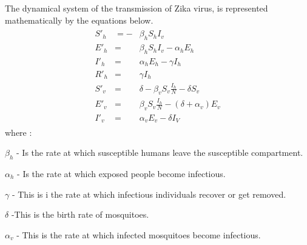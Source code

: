 The dynamical system of the transmission of Zika virus, is represented mathematically by the equations below.
\begin{align}
\begin{array}{lcl}  S'_h & = -&\beta_h S_h I_v  \\ E'_h & = & \beta_h S_h I_v - \alpha_h E_h  
\\ I'_h &= &\alpha_h E_h - \gamma I_h 
\\ R'_h &=& \gamma I_h 
\\ 
S'_v &=& \delta -\beta_v S_v \frac{I_h}{N} - \delta S_v
\\ E'_v & = & \beta_v S_v \frac{I_h}{N} - (\delta + \alpha_v) E_v
\\ I'_v & = &\alpha_v E_v - \delta I_V
 \end{array}
\end{align}
where :

$\beta_h$  - Is the rate at which susceptible humans leave the susceptible compartment.

$\alpha_h$ -  Is the rate at which exposed people become infectious.

$\gamma$ - This is i the rate at which infectious individuals recover or get removed.

$\delta$ -This is the birth rate of mosquitoes.

$\alpha_v$ - This is the rate at which infected mosquitoes become infectious.

